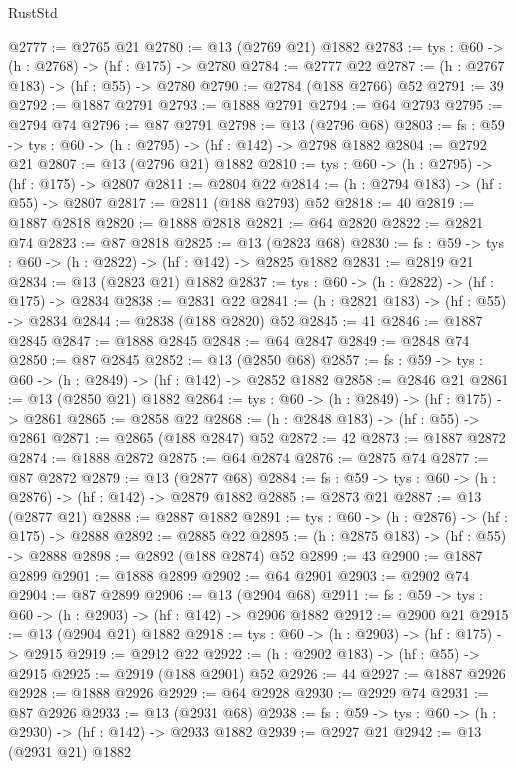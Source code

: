 \begin{lexlean}{RustStd}
\begin{coremodule}
@2777 := @2765 @21
@2780 := @13 (@2769 @21) @1882
@2783 := {tys : @60} -> (h : @2768) -> (hf : @175) -> @2780
@2784 := @2777 @22
@2787 := (h : @2767 @183) -> (hf : @55) -> @2780
@2790 := @2784 (@188 @2766) @52
@2791 := 39
@2792 := @1887 @2791
@2793 := @1888 @2791
@2794 := @64 @2793
@2795 := @2794 @74
@2796 := @87 @2791
@2798 := @13 (@2796 @68)
@2803 := {fs : @59} -> {tys : @60} -> (h : @2795) -> (hf : @142) -> @2798 @1882
@2804 := @2792 @21
@2807 := @13 (@2796 @21) @1882
@2810 := {tys : @60} -> (h : @2795) -> (hf : @175) -> @2807
@2811 := @2804 @22
@2814 := (h : @2794 @183) -> (hf : @55) -> @2807
@2817 := @2811 (@188 @2793) @52
@2818 := 40
@2819 := @1887 @2818
@2820 := @1888 @2818
@2821 := @64 @2820
@2822 := @2821 @74
@2823 := @87 @2818
@2825 := @13 (@2823 @68)
@2830 := {fs : @59} -> {tys : @60} -> (h : @2822) -> (hf : @142) -> @2825 @1882
@2831 := @2819 @21
@2834 := @13 (@2823 @21) @1882
@2837 := {tys : @60} -> (h : @2822) -> (hf : @175) -> @2834
@2838 := @2831 @22
@2841 := (h : @2821 @183) -> (hf : @55) -> @2834
@2844 := @2838 (@188 @2820) @52
@2845 := 41
@2846 := @1887 @2845
@2847 := @1888 @2845
@2848 := @64 @2847
@2849 := @2848 @74
@2850 := @87 @2845
@2852 := @13 (@2850 @68)
@2857 := {fs : @59} -> {tys : @60} -> (h : @2849) -> (hf : @142) -> @2852 @1882
@2858 := @2846 @21
@2861 := @13 (@2850 @21) @1882
@2864 := {tys : @60} -> (h : @2849) -> (hf : @175) -> @2861
@2865 := @2858 @22
@2868 := (h : @2848 @183) -> (hf : @55) -> @2861
@2871 := @2865 (@188 @2847) @52
@2872 := 42
@2873 := @1887 @2872
@2874 := @1888 @2872
@2875 := @64 @2874
@2876 := @2875 @74
@2877 := @87 @2872
@2879 := @13 (@2877 @68)
@2884 := {fs : @59} -> {tys : @60} -> (h : @2876) -> (hf : @142) -> @2879 @1882
@2885 := @2873 @21
@2887 := @13 (@2877 @21)
@2888 := @2887 @1882
@2891 := {tys : @60} -> (h : @2876) -> (hf : @175) -> @2888
@2892 := @2885 @22
@2895 := (h : @2875 @183) -> (hf : @55) -> @2888
@2898 := @2892 (@188 @2874) @52
@2899 := 43
@2900 := @1887 @2899
@2901 := @1888 @2899
@2902 := @64 @2901
@2903 := @2902 @74
@2904 := @87 @2899
@2906 := @13 (@2904 @68)
@2911 := {fs : @59} -> {tys : @60} -> (h : @2903) -> (hf : @142) -> @2906 @1882
@2912 := @2900 @21
@2915 := @13 (@2904 @21) @1882
@2918 := {tys : @60} -> (h : @2903) -> (hf : @175) -> @2915
@2919 := @2912 @22
@2922 := (h : @2902 @183) -> (hf : @55) -> @2915
@2925 := @2919 (@188 @2901) @52
@2926 := 44
@2927 := @1887 @2926
@2928 := @1888 @2926
@2929 := @64 @2928
@2930 := @2929 @74
@2931 := @87 @2926
@2933 := @13 (@2931 @68)
@2938 := {fs : @59} -> {tys : @60} -> (h : @2930) -> (hf : @142) -> @2933 @1882
@2939 := @2927 @21
@2942 := @13 (@2931 @21) @1882

\end{coremodule}
\end{lexlean}
